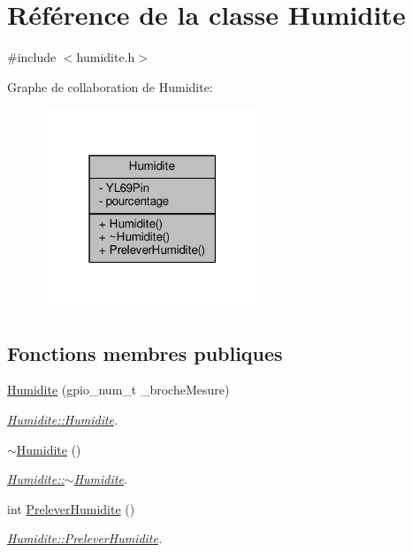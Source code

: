 \hypertarget{class_humidite}{}\section{Référence de la classe Humidite}
\label{class_humidite}


{\ttfamily \#include $<$humidite.\+h$>$}



Graphe de collaboration de Humidite\+:\nopagebreak
\begin{figure}[H]
\begin{center}
\leavevmode
\includegraphics[width=187pt]{class_humidite__coll__graph}
\end{center}
\end{figure}
\subsection*{Fonctions membres publiques}
\begin{DoxyCompactItemize}
\item 
\hyperlink{class_humidite_aca27c2f9386a6c48fae1ac47146282dc}{Humidite} (gpio\+\_\+num\+\_\+t \+\_\+broche\+Mesure)
\begin{DoxyCompactList}\small\item\em \hyperlink{class_humidite_aca27c2f9386a6c48fae1ac47146282dc}{Humidite\+::\+Humidite}. \end{DoxyCompactList}\item 
\hyperlink{class_humidite_ac03560148d13e0d08b7c70fc5878b0a0}{$\sim$\+Humidite} ()
\begin{DoxyCompactList}\small\item\em \hyperlink{class_humidite_ac03560148d13e0d08b7c70fc5878b0a0}{Humidite\+::$\sim$\+Humidite}. \end{DoxyCompactList}\item 
int \hyperlink{class_humidite_abc7c4e7f47a37409ab3ac45402fca85a}{Prelever\+Humidite} ()
\begin{DoxyCompactList}\small\item\em \hyperlink{class_humidite_abc7c4e7f47a37409ab3ac45402fca85a}{Humidite\+::\+Prelever\+Humidite}. \end{DoxyCompactList}\end{DoxyCompactItemize}
